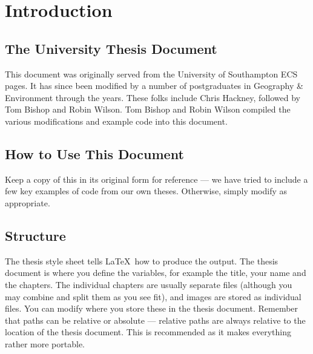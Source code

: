 \chapter{Introduction}
\section{The University Thesis Document}
This document was originally served from the University of Southampton ECS pages. It has since been modified by a number of postgraduates in Geography \& Environment through the years. These folks include Chris Hackney, followed by Tom Bishop and Robin Wilson. Tom Bishop and Robin Wilson compiled the various modifications and example code into this document.

\section{How to Use This Document}
Keep a copy of this in its original form for reference --- we have tried to include a few key examples of code from our own theses. Otherwise, simply modify as appropriate.

\section{Structure}
The thesis style sheet tells \LaTeX \ how to produce the output. The thesis document is where you define the variables, for example the title, your name and the chapters. The individual chapters are usually separate files (although you may combine and split them as you see fit), and images are stored as individual files. You can modify where you store these in the thesis document. Remember that paths can be relative or absolute --- relative paths are always relative to the location of the thesis document. This is recommended as it makes everything rather more portable.